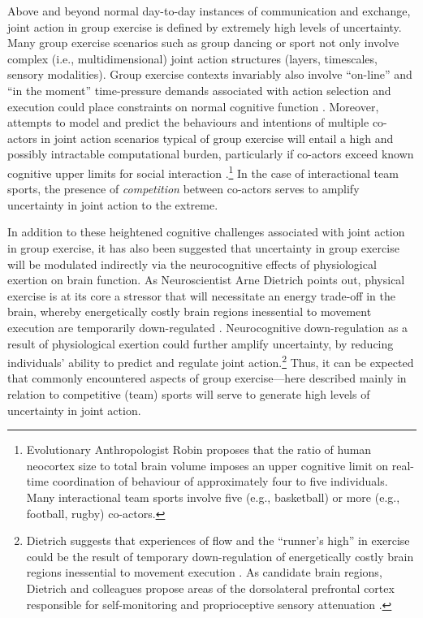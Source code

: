 \begin{CJK}{UTF8}{gbsn}
Above and beyond normal day-to-day instances of communication and exchange, joint action in group exercise is defined by extremely high levels of uncertainty.  Many group exercise scenarios such as group dancing or sport not only involve complex (i.e., multidimensional) joint action structures (layers, timescales, sensory modalities).  Group exercise contexts invariably also involve ``on-line'' and ``in the moment'' time-pressure demands associated with action selection and execution could place constraints on normal cognitive function \citep[as has been shown in laboratory studies of decision-making studies;][]{Kerstholt1994,Maule2000}.  Moreover, attempts to model and predict the behaviours and intentions of multiple co-actors in joint action scenarios typical of group exercise will entail a high and possibly intractable computational burden, particularly if co-actors exceed known cognitive upper limits for social interaction \citep{Dunbar1992}.\footnote{Evolutionary Anthropologist Robin \textcite{Dunbar1992} proposes that the ratio of human neocortex size to total brain volume imposes an upper cognitive limit on real-time coordination of behaviour of approximately four to five individuals.  Many interactional team sports involve five (e.g., basketball) or more (e.g., football, rugby) co-actors.}  In the case of interactional team sports, the presence of \textit{competition} between co-actors \citep[whereby one individual or team of individuals actively attempts to foil or disrupt the actions of another individual or team of individuals;  see][]{Reimer2006} serves to amplify uncertainty in joint action to the extreme.

In addition to these heightened cognitive challenges associated with joint action in group exercise, it has also been suggested that uncertainty in group exercise will be modulated indirectly via the neurocognitive effects of physiological exertion on brain function.  As Neuroscientist Arne Dietrich points out, physical exercise is at its core a stressor that will necessitate an energy trade-off in the brain, whereby energetically costly brain regions inessential to movement execution are temporarily down-regulated \citep{Dietrich2004b}. Neurocognitive down-regulation as a result of physiological exertion could further amplify uncertainty, by reducing individuals' ability to predict and regulate joint action.\footnote{Dietrich suggests that experiences of flow and the ``runner's high'' in exercise could be the result of temporary down-regulation of energetically costly brain regions inessential to movement execution \citep{Dietrich2004b}.  As candidate brain regions, Dietrich and colleagues propose areas of the dorsolateral prefrontal cortex responsible for self-monitoring and proprioceptive sensory attenuation \citep[commonly known as the ``inner critic'' regions of the brain; see][]{Limb2008}.}  Thus, it can be expected that commonly encountered aspects of group exercise---here described mainly in relation to competitive (team) sports will serve to generate high levels of uncertainty in joint action.


\end{CJK}
